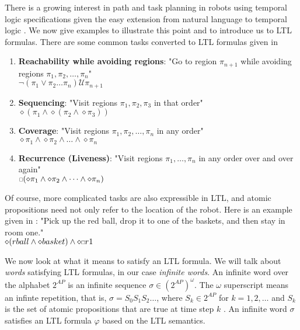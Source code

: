 There is a growing interest in path and task planning in robots using temporal logic specifications given the easy extension from natural language to temporal logic \cite{kress07}. We now give examples to illustrate this point and to introduce us to LTL formulas. There are some common tasks converted to LTL formulas given in \cite{fainekos09} 
\begin{enumerate}
    \item \textbf{Reachability while avoiding regions}: "Go to region $\pi_{n+1}$ while avoiding regions $\pi_1, \pi_2, \dots, \pi_n$" \\ $\neg(\pi_1 \lor \pi_2 \dots \pi_n) \mathcal{U} \pi_{n+1}$ 
    \item \textbf{Sequencing}: "Visit regions $\pi_1, \pi_2, \pi_3$ in that order"\\ 
    $\diamond (\pi_1 \land \diamond(\pi_2 \land \diamond \pi_3))$ 
    \item \textbf{Coverage}: "Visit regions $\pi_1, \pi_2, \dots, \pi_n$ in any order"\\ $\diamond \pi_1 \land \diamond \pi_2 \land \dots \land \diamond \pi_n$
    \item \textbf{Recurrence (Liveness)}: "Visit regions $\pi_1, \dots, \pi_n$ in any order over and over again"\\ $\ssquare(\diamond \pi_1 \land \diamond \pi_2 \land \dots \land \diamond \pi_n)$      
\end{enumerate}
Of course, more complicated tasks are also expressible in LTL, and atomic propositions need not only refer to the location of the robot. Here is an example given in \cite{guo15}: "Pick up the red ball, drop it to one of the baskets, and then stay in room one." \\
$\diamond(rball \land \diamond basket) \land \diamond \ssquare r1$ 

We now look at what it means to satisfy an LTL formula. We will talk about \textit{words} satisfying LTL formulas, in our case \textit{infinite words}. An infinite word over the alphabet $2^{AP}$ is an infinite sequence $\sigma \in (2^{AP})^\omega$. The $\omega$ superscript means an infinte repetition, that is, $\sigma = S_0 S_1 S_2 \dots$, where $S_k \in 2^{AP}$ for $k=1,2,\dots$ and $S_k$ is the set of atomic propositions that are true at time step $k$ \cite{guo15}. An infinite word $\sigma$ satisfies an LTL formula $\varphi$ based on the LTL semantics.  

